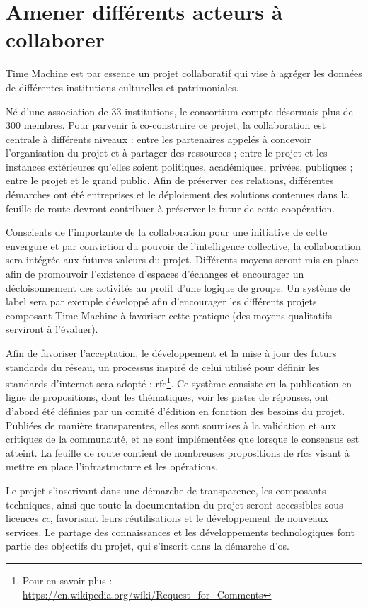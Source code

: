 \section {Amener différents acteurs à collaborer}
Time Machine est par essence un projet collaboratif qui vise à agréger les données de différentes institutions culturelles et patrimoniales.

Né d'une association de 33 institutions, le consortium compte désormais plus de 300 membres. Pour parvenir à co-construire ce projet, la collaboration est centrale à différents niveaux : entre les  partenaires appelés à concevoir l'organisation du projet et à partager des ressources ; entre le projet et les instances extérieures qu'elles soient politiques, académiques, privées, publiques ; entre le projet et le grand public. Afin de préserver ces relations, différentes démarches ont été entreprises et le déploiement des solutions contenues dans la feuille de route devront contribuer à préserver le futur de cette coopération. 

Conscients de l'importante de la collaboration pour une initiative de cette envergure et par conviction du pouvoir de l'intelligence collective, la collaboration sera intégrée aux futures valeurs du projet. Différents moyens seront mis en place afin de promouvoir l'existence d'espaces d'échanges et encourager un décloisonnement des activités au profit d'une logique de groupe. Un système de label sera par exemple développé afin d'encourager les différents projets composant Time Machine à favoriser cette pratique (des moyens qualitatifs serviront à l'évaluer).

Afin de favoriser l'acceptation, le développement et la mise à jour des futurs standards du réseau, un processus inspiré de celui utilisé pour définir les standards d'internet sera adopté : \gls{rfc}\footnote{Pour en savoir plus : \url{https://en.wikipedia.org/wiki/Request_for_Comments}}. Ce système consiste en la publication en ligne de propositions, dont les thématiques, voir les pistes de réponses, ont d'abord été définies par un comité d'édition en fonction des besoins du projet. Publiées de manière transparentes, elles sont soumises à la validation et aux critiques de la communauté, et ne sont implémentées que lorsque le consensus est atteint. La feuille de route contient de nombreuses propositions de \gls{rfc}s visant à mettre en place l'infrastructure et les opérations.

Le projet s'inscrivant dans une démarche de transparence, les composants techniques, ainsi que toute la documentation du projet seront accessibles sous licences \textit{\gls{cc}}, favorisant leurs réutilisations et le développement de nouveaux services. Le partage des connaissances et les développements technologiques font partie des objectifs du projet, qui s'inscrit dans la démarche d'\gls{os}.

